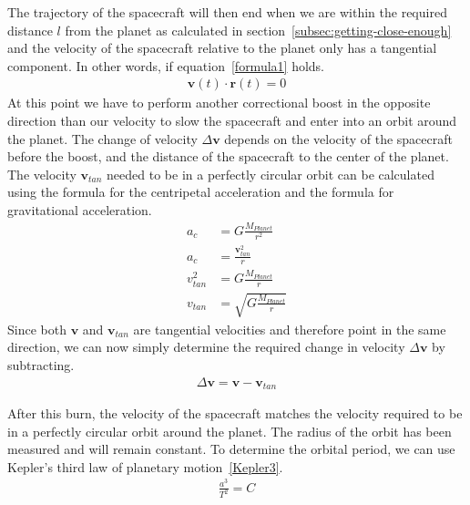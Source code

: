 \documentclass[reprint,english,notitlepage]{revtex4-2}
\begin{document}
    The trajectory of the spacecraft will then end when we are within the required distance $l$ from the planet as calculated in section~\ref{subsec:getting-close-enough} and the velocity of the spacecraft relative to the planet only has a tangential component.
    In other words, if equation~\eqref{formula1} holds.
    \begin{align}
        \textbf{v}(t) \cdot \textbf{r}(t) = 0 \label{formula1}
    \end{align}
    At this point we have to perform another correctional boost in the opposite direction than our velocity to slow the spacecraft and enter into an orbit around the planet.
    The change of velocity $\Delta \textbf{v}$ depends on the velocity of the spacecraft before the boost, and the distance of the spacecraft to the center of the planet.\\
    The velocity $\textbf{v}_{tan}$ needed to be in a perfectly circular orbit can be calculated using the formula for the centripetal acceleration and the formula for gravitational acceleration.
    \begin{align*}
        a_c &= G \frac{M_{Planet}}{r^2}\\
        a_c &= \frac{\textbf{v}_{tan}^2}{r}\\
        v_{tan}^2 &= G \frac{M_{Planet}}{r}\\
        v_{tan} &= \sqrt{G \frac{M_{Planet}}{r}}
    \end{align*}
    Since both $ \textbf{v}$ and $\textbf{v}_{tan}$ are tangential velocities and therefore point in the same direction, we can now simply determine the required change in velocity $\Delta \textbf{v}$ by subtracting.
    \begin{align*}
        \Delta \textbf{v} = \textbf{v} - \textbf{v}_{tan}
    \end{align*}

    After this burn, the velocity of the spacecraft matches the velocity required to be in a perfectly circular orbit around the planet.
    The radius of the orbit has been measured and will remain constant.
    To determine the orbital period, we can use Kepler's third law of planetary motion~\eqref{Kepler3}.
    \begin{align}
        \frac{a^3}{T^2} = C \label{Kepler3}
    \end{align}
\end{document}
